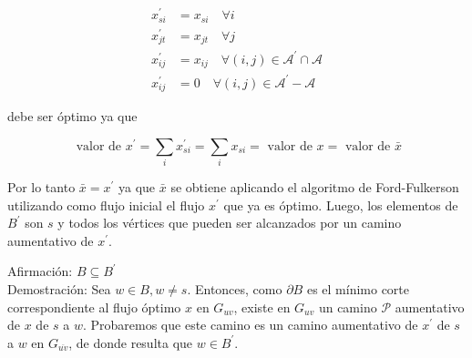 \documentclass[10pt]{article}
\begin{document}
$$
\begin{aligned}
x_{s i}^{\prime} & =x_{s i} \quad \forall i \\
x_{j t}^{\prime} & =x_{j t} \quad \forall j \\
x_{i j}^{\prime} & =x_{i j} \quad \forall(i, j) \in \mathcal{A}^{\prime} \cap \mathcal{A} \\
x_{i j}^{\prime} & =0 \quad \forall(i, j) \in \mathcal{A}^{\prime}-\mathcal{A}
\end{aligned}
$$

debe ser óptimo ya que

$$
\text { valor de } x^{\prime}=\sum_{i} x_{s i}^{\prime}=\sum_{i} x_{s i}=\text { valor de } x=\text { valor de } \bar{x}
$$

Por lo tanto $\bar{x}=x^{\prime}$ ya que $\bar{x}$ se obtiene aplicando el algoritmo de Ford-Fulkerson utilizando como flujo inicial el flujo $x^{\prime}$ que ya es óptimo. Luego, los elementos de $B^{\prime}$ son $s$ y todos los vértices que pueden ser alcanzados por un camino aumentativo de $x^{\prime}$.

Afirmación: $B \subseteq B^{\prime}$\\
Demostración: Sea $w \in B, w \neq s$. Entonces, como $\partial B$ es el mínimo corte correspondiente al flujo óptimo $x$ en $G_{u v}$, existe en $G_{u v}$ un camino $\mathcal{P}$ aumentativo de $x$ de $s$ a $w$. Probaremos que este camino es un camino aumentativo de $x^{\prime}$ de $s$ a $w$ en $G_{\overline{u v}}$, de donde resulta que $w \in B^{\prime}$.
\end{document}
